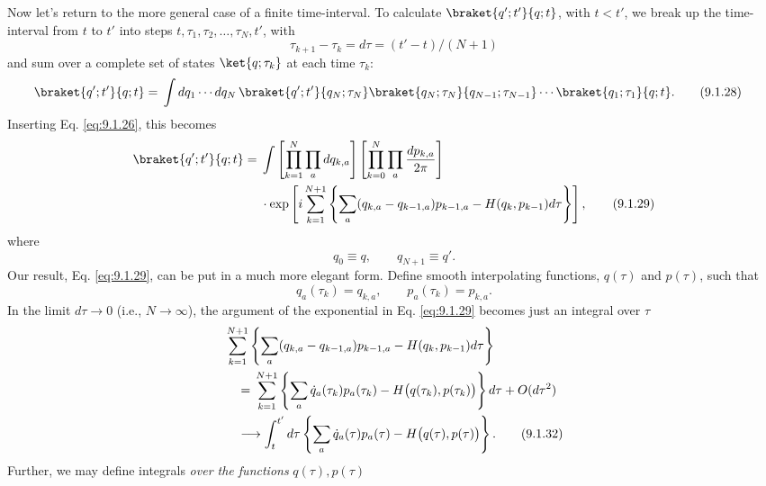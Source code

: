 Now let's return to the more general case of a finite time-interval. To
calculate $\braket{q';t'}{q;t}$, with $t<t'$, we break up the time-interval
from $t$ to $t'$ into steps $t,\tau_1,\tau_2,\ldots,\tau_N,t'$, with
\begin{equation}
  \tau_{k+1}-\tau_k=d\tau=(t'-t)/(N+1)
  \tag{9.1.27}\label{eq:9.1.27}
\end{equation}
and sum over a complete set of states $\ket{q;\tau_k}$ at each time
$\tau_k$:
\begin{align}
  \braket{q';t'}{q;t}
  ={}&\int dq_1\cdots dq_N\,\braket{q';t'}{q_N;\tau_N}
  \braket{q_N;\tau_N}{q_{N-1};\tau_{N-1}}\cdots
  \braket{q_1;\tau_1}{q;t}.
  \tag{9.1.28}\label{eq:9.1.28}
\end{align}
Inserting Eq. \eqref{eq:9.1.26}, this becomes
\begin{align}
  \braket{q';t'}{q;t}
  ={}&\int
  \left[\prod_{k=1}^{N}\prod_a dq_{k,a}\right]
  \left[\prod_{k=0}^{N}\prod_a\frac{dp_{k,a}}{2\pi}\right]\notag \\
  &\cdot \exp\left[i\sum_{k=1}^{N+1}
  \left\{\sum_a(q_{k,a}-q_{k-1,a})p_{k-1,a}
  -H(q_k,p_{k-1})d\tau\right\}\right],
  \tag{9.1.29}\label{eq:9.1.29}
\end{align}
where
\begin{equation}
  q_0\equiv q,
  \qquad
  q_{N+1}\equiv q'.
  \tag{9.1.30}\label{eq:9.1.30}
\end{equation}
Our result, Eq. \eqref{eq:9.1.29}, can be put in a much more elegant form. Define
smooth interpolating functions, $q(\tau)$ and $p(\tau)$, such that
\begin{equation}
  q_a(\tau_k)=q_{k,a},
  \qquad
  p_a(\tau_k)=p_{k,a}.
  \tag{9.1.31}\label{eq:9.1.31}
\end{equation}
In the limit $d\tau\to0$ (i.e., $N\to\infty$), the argument of the
exponential in Eq. \eqref{eq:9.1.29} becomes just an integral over $\tau$
\begin{align}
  &\sum_{k=1}^{N+1}\left\{\sum_a(q_{k,a}-q_{k-1,a})p_{k-1,a}
  -H(q_k,p_{k-1})d\tau\right\}
  \notag\\
  &\quad={}
  \sum_{k=1}^{N+1}\left\{\sum_a\dot q_a(\tau_k)p_a(\tau_k)
  -H\bigl(q(\tau_k),p(\tau_k)\bigr)\right\}d\tau+O(d\tau^2)
  \notag\\
  &\quad\longrightarrow
  \int_t^{t'}d\tau\left\{\sum_a\dot q_a(\tau)p_a(\tau)
  -H\bigl(q(\tau),p(\tau)\bigr)\right\}.
  \tag{9.1.32}\label{eq:9.1.32}
\end{align}
Further, we may define integrals \emph{over the functions} $q(\tau),p(\tau)$
